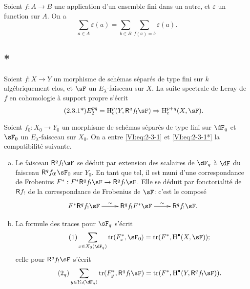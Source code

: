 Soient $f:A\to B$ une application d'un ensemble fini dans un autre, et 
$\varepsilon$ un function sur $A$. On a 
\begin{equation*}\tag{2.3.1}\label{VI:eq:2-3-1}
  \sum_{a\in A} \varepsilon(a) = \sum_{b\in B} \sum_{f(a)=b} \varepsilon(a) \text{.}
\end{equation*}





\addtocounter{subsection}{-1}
\subsection{*}\label{VI:2-3*}

Soient $f:X\to Y$ un morphisme de sch\'emas s\'epar\'es de type fini sur $k$ 
alg\'ebriquement clos, et $\sF$ un $E_\lambda$-faisceau sur $X$. La suite 
spectrale de Leray de $f$ en cohomologie \`a support propre s'\'ecrit 
\begin{align*}\tag{2.3.1*}\label{VI:eq:2-3-1*}
  E_2^{p q} = \h_c^p(Y,\R^q f_! \sF) \Rightarrow \h_c^{p+q}(X,\sF) \text{.}
\end{align*}

Soient $f_0:X_0 \to Y_0$ un morphisme de sch\'emas s\'epar\'es de type fini sur 
$\dF_q$ et $\sF_0$ un $E_\lambda$-faisceau sur $X_0$. On a entre 
\eqref{VI:eq:2-3-1} et \eqref{VI:eq:2-3-1*} la compatibilit\'e suivante. 

\begin{enumerate}[a)]
  \item Le faisceau $\R^q f_! \sF$ se d\'eduit par extension des scalaires de 
    $\dF_q$ \`a $\dF$ du faisceau $\R^q f_{0!} \sF_0$ sur $Y_0$. En tant que 
    tel, il est muni d'une correspondance de Frobenius 
    $F^\ast:F^\ast\R^q f_! \sF \to \R^q f_! \sF$. Elle se d\'eduit par 
    fonctorialit\'e de $\mathsf{R} f_!$ de la correspondance de Frobenius de $\sF$: 
    c'est le compos\'e 
    \[\xymatrix{
      F^\ast \R^q f_! \sF \ar[r]^-\sim 
        & \R^q f_! F^\ast \sF \ar[r]^-\sim 
        & \R^q f_! \sF \text{.}
    }\]
  \item La formule des traces pour $\sF_q$ s'\'ecrit 
    \begin{align*}\tag{1}\label{VI:eq:1}
      \sum_{x\in X_0(\dF_q)} \tr(F_x^\ast,\sF_0) = \tr(F^\ast,\h^\bullet(X,\sF)) \text{;}
    \end{align*}
    celle pour $\R^q f_! \sF$ s'\'ecrit 
    \begin{align*}\tag{2$_q$}\label{VI:eq:2_q} 
      \sum_{y\in Y_0(\dF_q)} \tr(F_y^\ast,\R^q f_! \sF) = \tr(F^\ast, \h^\bullet(Y,\R^q f_! \sF)) \text{.}
    \end{align*}
\end{enumerate}


